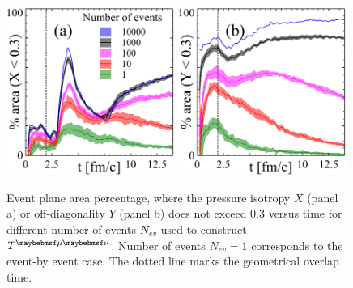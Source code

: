 \begin{figure}
  \includegraphics[width = 0.49\textwidth]{plots/thermalization_urqmd/E80_b6_x_area_Nev_dep.pdf}
  \includegraphics[width = 0.49\textwidth]{plots/thermalization_urqmd/E80_b6_y_area_Nev_dep.pdf}
  \caption{Event plane area percentage, where the pressure isotropy $X$ (panel a) or
           off-diagonality $Y$ (panel b) does not exceed 0.3 versus time for different
           number of events $N_{ev}$ used to construct $\Tmn$. Number of events
           $N_{ev} = 1$ corresponds to the event-by event case. The dotted line marks
           the geometrical overlap time.}
  \label{FIG:sensitivity_Nev}
\end{figure}

